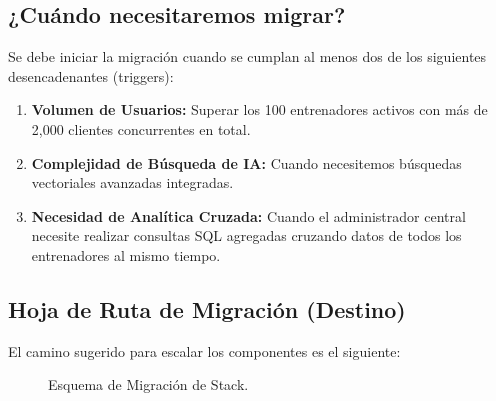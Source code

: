 \documentclass[11pt]{article}
\begin{document}
\subsection{¿Cuándo necesitaremos migrar?}
Se debe iniciar la migración cuando se cumplan al menos dos de los siguientes desencadenantes (triggers):
\begin{enumerate}
    \item \textbf{Volumen de Usuarios:} Superar los 100 entrenadores activos con más de 2,000 clientes concurrentes en total.
    \item \textbf{Complejidad de Búsqueda de IA:} Cuando necesitemos búsquedas vectoriales avanzadas integradas.
    \item \textbf{Necesidad de Analítica Cruzada:} Cuando el administrador central necesite realizar consultas SQL agregadas cruzando datos de todos los entrenadores al mismo tiempo.
\end{enumerate}

\subsection{Hoja de Ruta de Migración (Destino)}
El camino sugerido para escalar los componentes es el siguiente:

\begin{figure}[h]
\centering
{}
\caption{Esquema de Migración de Stack.}
\end{figure}
\end{document}
